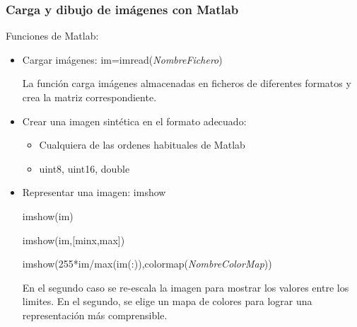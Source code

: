 \documentclass[handout]{beamer}
\numberwithin{section}{part}
\begin{document}
\begin{frame}
  \frametitle{Carga y dibujo de im\'{a}genes con Matlab}
  \small

  Funciones de Matlab:

  \begin{itemize}

  \small

  \item Cargar im\'{a}genes: \color{blue} im=imread(\textit{NombreFichero}) \color{black}

  \color{gray}
  La funci\'{o}n carga im\'{a}genes almacenadas en ficheros de diferentes formatos y crea la matriz correspondiente.
  \color{black}

  \item Crear una imagen sint\'{e}tica en el formato adecuado:
  \begin{itemize}
  \item Cualquiera de las ordenes habituales de Matlab
  \item \color{blue} uint8, uint16, double \color{black}
  \end{itemize}

  \item Representar una imagen: \color{blue} imshow\color{black}

  \hspace{0.5cm}\color{blue} imshow(im) \color{black}

  \hspace{0.5cm}\color{blue} imshow(im,[minx,max]) \color{black}

  \hspace{0.5cm}\color{blue} imshow(255*im/max(im(:)),colormap(\textit{NombreColorMap})) \color{black}

  \color{gray}
  En el segundo caso se re-escala la imagen para mostrar los valores entre los limites. En el segundo, se elige un mapa de colores para lograr una representaci\'{o}n m\'{a}s comprensible.

  \color{black}
  \end{itemize}
\end{frame}
\end{document}
